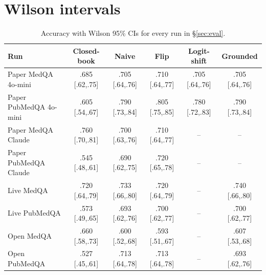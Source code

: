 \documentclass[11pt]{article}
\begin{document}
\section{Wilson intervals}
\label{app:stats}
\begin{table}[h]
\centering\scriptsize\setlength{\tabcolsep}{2pt}
\begin{tabular}{lccccc}
\toprule
Run & Closed-book & Naive & Flip & Logit-shift & Grounded\\
\midrule
Paper MedQA 4o-mini & .685 [.62,.75] & .705 [.64,.76] & .710 [.64,.77] & .705 [.64,.76] & .705 [.64,.76]\\
Paper PubMedQA 4o-mini & .605 [.54,.67] & .790 [.73,.84] & .805 [.75,.85] & .780 [.72,.83] & .790 [.73,.84]\\
Paper MedQA Claude & .760 [.70,.81] & .700 [.63,.76] & .710 [.64,.77] & -- & --\\
Paper PubMedQA Claude & .545 [.48,.61] & .690 [.62,.75] & .720 [.65,.78] & -- & --\\
Live MedQA & .720 [.64,.79] & .733 [.66,.80] & .720 [.64,.79] & -- & .740 [.66,.80]\\
Live PubMedQA & .573 [.49,.65] & .693 [.62,.76] & .700 [.62,.77] & -- & .700 [.62,.77]\\
Open MedQA & .660 [.58,.73] & .600 [.52,.68] & .593 [.51,.67] & -- & .607 [.53,.68]\\
Open PubMedQA & .527 [.45,.61] & .713 [.64,.78] & .713 [.64,.78] & -- & .693 [.62,.76]\\
\bottomrule
\end{tabular}
\caption{Accuracy with Wilson 95\% CIs for every run in \S\ref{sec:eval}.}
\label{tab:wilson}
\end{table}
\end{document}
